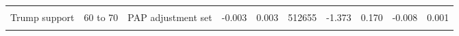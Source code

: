 \begin{table}
\begin{tabular}[t]{lllrrrrrrr}
\cellcolor{gray!10}{Trump support} & \cellcolor{gray!10}{60 to 70} & \cellcolor{gray!10}{Unadjusted} & \cellcolor{gray!10}{-0.004} & \cellcolor{gray!10}{0.003} & \cellcolor{gray!10}{512658} & \cellcolor{gray!10}{-1.454} & \cellcolor{gray!10}{0.146} & \cellcolor{gray!10}{-0.010} & \cellcolor{gray!10}{0.001}\\
Trump support & 60 to 70 & PAP adjustment set & -0.003 & 0.003 & 512655 & -1.373 & 0.170 & -0.008 & 0.001\\
\cellcolor{gray!10}{Trump support} & \cellcolor{gray!10}{60 to 70} & \cellcolor{gray!10}{Full adjustment set} & \cellcolor{gray!10}{-0.004} & \cellcolor{gray!10}{0.003} & \cellcolor{gray!10}{512626} & \cellcolor{gray!10}{-1.477} & \cellcolor{gray!10}{0.140} & \cellcolor{gray!10}{-0.009} & \cellcolor{gray!10}{0.001}\\
\bottomrule
\end{tabular}
\end{table}

